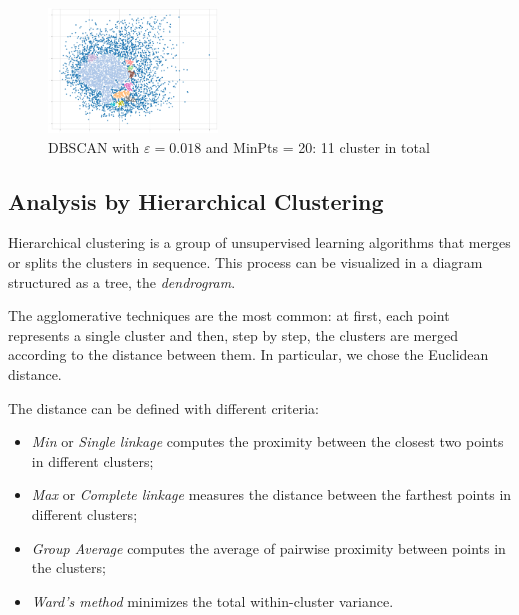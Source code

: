 \documentclass[a4paper,11pt,dvipsnames]{article}
\begin{document}


\begin{figure}[h]
    \centering
    \includegraphics[width=0.4\textwidth]{dbscan.png}
    \caption{DBSCAN with $\varepsilon= 0.018$ and MinPts = 20: 11 cluster in total}
    \label{fig:dbscan}
\end{figure}

\subsection{Analysis by Hierarchical Clustering}
Hierarchical clustering is a group of unsupervised learning algorithms that merges or splits the clusters in sequence. This process can be visualized in a diagram structured as a tree, the \textit{dendrogram}. 

The agglomerative techniques are the most common: at first, each point represents a single cluster and then, step by step, the clusters are merged according to the distance between them. In particular, we chose the Euclidean distance. 

The distance can be defined with different criteria: 
\begin{itemize}
    \item \textit{Min} or \textit{Single linkage} computes the proximity between the closest two points in different clusters;
    \item \textit{Max} or \textit{Complete linkage} measures the distance between the farthest points in different clusters;
    \item \textit{Group Average} computes the average of pairwise proximity between points in the clusters;
    \item \textit{Ward's method} minimizes the total within-cluster variance.
\end{itemize}
\end{document}
